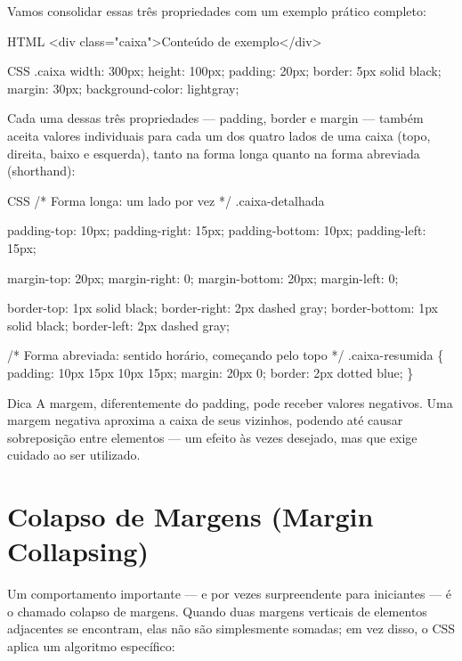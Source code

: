 Vamos consolidar essas três propriedades com um exemplo prático completo:

\begin{codebox}{HTML}
<div class="caixa">Conteúdo de exemplo</div>
\end{codebox}

\begin{codebox}{CSS}
.caixa {
  width: 300px;
  height: 100px;
  padding: 20px;
  border: 5px solid black;
  margin: 30px;
  background-color: lightgray;
}
\end{codebox}

Cada uma dessas três propriedades — padding, border e margin — também aceita valores individuais para cada um dos quatro lados de uma caixa (topo, direita, baixo e esquerda), tanto na forma longa quanto na forma abreviada (shorthand):

\begin{codebox}{CSS}
/* Forma longa: um lado por vez */
.caixa-detalhada {
  padding-top: 10px;
  padding-right: 15px;
  padding-bottom: 10px;
  padding-left: 15px;

    margin-top: 20px;
    margin-right: 0;
    margin-bottom: 20px;
    margin-left: 0;

    border-top: 1px solid black;
    border-right: 2px dashed gray;
    border-bottom: 1px solid black;
    border-left: 2px dashed gray;
}
\end{codebox}

/* Forma abreviada: sentido horário, começando pelo topo */ .caixa-resumida \{ padding: 10px 15px 10px 15px; margin: 20px 0; border: 2px dotted blue; \}

\begin{infobox}{Dica}
A margem, diferentemente do padding, pode receber valores negativos. Uma margem negativa aproxima a caixa de seus vizinhos, podendo até causar sobreposição entre elementos — um efeito às vezes desejado, mas que exige cuidado ao ser utilizado.
\end{infobox}

\section{Colapso de Margens (Margin Collapsing)}

Um comportamento importante — e por vezes surpreendente para iniciantes — é o chamado colapso de margens. Quando duas margens verticais de elementos adjacentes se encontram, elas não são simplesmente somadas; em vez disso, o CSS aplica um algoritmo específico:

